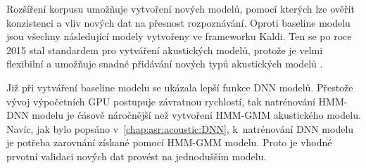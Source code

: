 
Rozšíření korpusu umožňuje vytvoření nových modelů, pomocí kterých lze ověřit konzistenci a vliv nových dat na přesnost rozpoznávání.
Oproti baseline modelu jsou všechny následující modely vytvořeny ve frameworku Kaldi.
Ten se po roce 2015 stal standardem pro vytváření akustických modelů, protože je velmi flexibilní a umožňuje snadné přidávání nových typů akustických modelů \cite{Kaldi2011}.


Již při vytváření baseline modelu se ukázala lepší funkce DNN modelů.
Přestože vývoj výpočetních GPU postupuje závratnou rychlostí, tak natrénování HMM-DNN modelu je čásově náročnější než vytvoření HMM-GMM akustického modelu.
Navíc, jak bylo popsáno v~\ref{chap:asr:acoustic:DNN},  k~natrénování DNN modelu je potřeba zarovnání získané pomocí HMM-GMM modelu.
Proto je vhodné prvotní validaci nových dat provést na jednodušším modelu.



